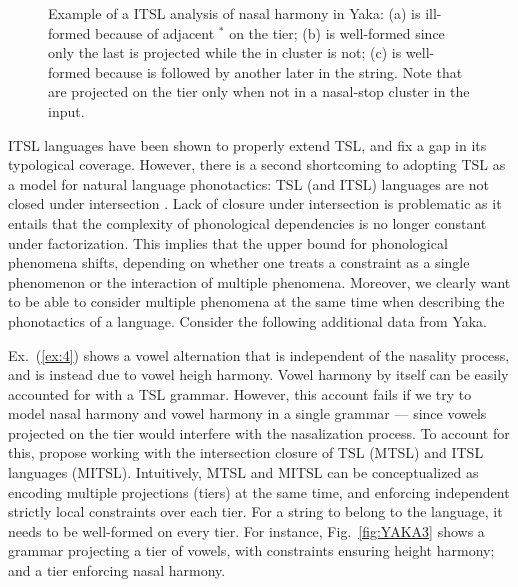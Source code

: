 \documentclass[11pt,a4paper]{article}
\begin{document}
\begin{figure}[]
\begin{center}
    \scalebox{0.8}{
       
         
         }
         \scalebox{0.8}{
      
      }
        \end{center}
        \caption{Example of a ITSL analysis of nasal harmony in Yaka: (a) is ill-formed because of adjacent $^*$\textipa{[nd]} on the tier; (b) is well-formed since only the last \textipa{[d]} is projected while the \textipa{[n]} in \textipa{[nd]} cluster is not;
        (c) is well-formed because \textipa{[n]} is followed by another  \textipa{[n]} later in the string.
        Note that \textipa{[n,d,g,N]} are projected on the tier only when not in a nasal-stop cluster in the input. }
        \label{fig:YAKA2}
        \end{figure}

ITSL languages have been shown to properly extend TSL, and fix a gap in its typological coverage. 
However, there is a second shortcoming to adopting TSL as a model for natural language phonotactics:  TSL (and ITSL) languages are not closed under intersection \citep{desanto2019structure}.
Lack of closure under intersection is problematic as it entails that the complexity of phonological dependencies is no longer constant under factorization.
This implies that the upper bound for phonological phenomena shifts, depending on whether one treats a constraint as a single phenomenon or the interaction of multiple phenomena.
Moreover, we clearly want to be able to consider multiple phenomena at the same time when describing the phonotactics of a language.
Consider the following additional data from Yaka.
\begin{exe}
    \ex\label{ex:4}\begin{xlist}
    	 \ex\label{ex:4a}    
	 \ex\label{ex:4b} 
	\end{xlist}
\end{exe}
Ex.~(\ref{ex:4}) shows a vowel alternation that is independent of the nasality process, and is instead due to vowel heigh harmony.
Vowel harmony by itself can be easily accounted for with a TSL grammar.
However, this account fails if we try to model nasal harmony and vowel harmony in a single grammar --- since vowels projected on the tier would interfere with the nasalization process.
To account for this, \citet{desanto2019structure} propose  working with the intersection closure of TSL (MTSL) and ITSL languages (MITSL).
Intuitively, MTSL and MITSL can be conceptualized as encoding multiple projections (tiers) at the same time, and enforcing independent strictly local constraints over each tier.
For a string to belong to the language, it needs to be well-formed on every tier.
For instance, Fig.~\ref{fig:YAKA3} shows a grammar projecting a tier of vowels, with constraints ensuring height harmony; and a tier enforcing nasal harmony.
\end{document}
